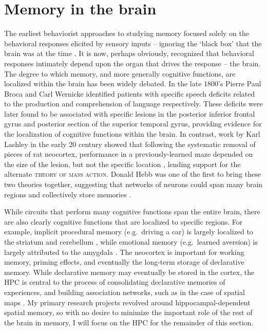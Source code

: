 \section{Memory in the brain}
\label{sec:intro:memory:structure}
The earliest behaviorist approaches to studying memory focused solely on the behavioral responses elicited by sensory inputs -- ignoring the `black box' that the brain was at the time \citep{Watson1913}.
It is now, perhaps obviously, recognized that behavioral responses intimately depend upon the organ that drives the response -- the brain.
The degree to which memory, and more generally cognitive functions, are localized within the brain has been widely debated.
In the late 1800's Pierre Paul Broca and Carl Wernicke identified patients with specific speech deficits related to the production and comprehension of language respectively.
These deficits were later found to be associated with specific lesions in the posterior inferior frontal gyrus and posterior section of the superior temporal gyrus, providing evidence for the localization of cognitive functions within the brain.
In contrast, work by Karl Lashley in the early 20 century showed that following the systematic removal of pieces of rat neocortex, performance in a previously-learned maze depended on the size of the lesion, but not the specific location \citep{Lashley1929}, lending support for the alternate \textsc{theory of mass action}.
Donald Hebb was one of the first to bring these two theories together, suggesting that networks of neurons could span many brain regions and collectively store memories \citep{Hebb1949}.

While circuits that perform many cognitive functions span the entire brain, there are also clearly cognitive functions that are localized to specific regions.
For example, implicit procedural memory (e.g.~driving a car) is largely localized to the striatum and cerebellum \citep{Knowlton1996, Gerwig2007, Eichenbaum2000}, while emotional memory (e.g.~learned aversion) is largely attributed to the amygdala \citep{LeDoux2000}.
The neocortex is important for working memory, priming effects, and eventually the long-term storage of declarative memory.
While declarative memory may eventually be stored in the cortex, the \ac{HPC} is central to the process of consolidating declarative memories of experiences, and building association networks, such as in the case of spatial maps \citep{Eichenbaum2000}.
My primary research projects revolved around hippocampal-dependent spatial memory, so with no desire to minimize the important role of the rest of the brain in memory, I will focus on the \ac{HPC} for the remainder of this section. 

